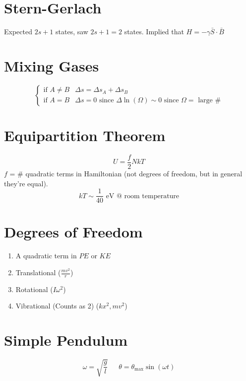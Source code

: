 \documentclass[10pt,a4paper]{article}
\begin{document}
\section{Stern-Gerlach} %
\label{sec:stern_gerlach}
Expected $2s+1$ states, saw $2s+1=2$ states. Implied that $H = -\gamma \bar{S} \cdot \bar{B}$

\section{Mixing Gases} %
\label{sec:mixing_gases}
\[
  \begin{cases}
   \textrm{if } A \neq B & \Delta s = \Delta s_A + \Delta s_B\\
   \textrm{if } A = B&  \Delta s = 0 \textrm{ since }\Delta\ln(\Omega) \sim 0 \textrm{ since } \Omega = \textrm{ large \#}
  \end{cases}
\]

\section{Equipartition Theorem} %
\label{sec:equipartition_theorem}
\begin{equation}
    U = \frac{f}{2}NkT
\end{equation}
$f$ = \# quadratic terms in Hamiltonian (not degrees of freedom, but in general they're equal).
\begin{equation}
    kT \sim \frac{1}{40} \textrm{ eV @ room temperature}
\end{equation}

\section{Degrees of Freedom} %
\label{sec:degrees_of_freedom}
\begin{enumerate}
    \item A quadratic term in $PE$ or $KE$
    \item Translational ($\frac{mv^2}{r}$)
    \item Rotational ($I\omega^2$)
    \item Vibrational (Counts as 2) ($kx^2, mv^2$)
\end{enumerate}

\section{Simple Pendulum} %
\label{sec:simple_pendulum}
\begin{equation}
    \omega = \sqrt{\frac{g}{l}}~~~~~~~\theta = \theta_{\textrm{max}}\sin(\omega t)
\end{equation}
\end{document}
